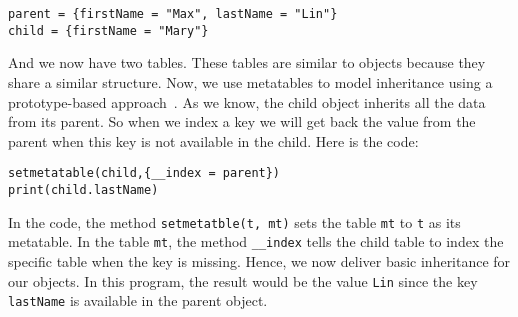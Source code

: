 \begin{verbatim}
parent = {firstName = "Max", lastName = "Lin"} 
child = {firstName = "Mary"} 
\end{verbatim}

And we now have two tables. These tables are similar to objects because they share a similar structure. Now, we use metatables to model inheritance using a prototype-based approach~\cite{PIJS}. As we know, the child object inherits all the data from its parent. So when we index a key we will get back the value from the parent when this key is not available in the child. Here is the code:

\begin{verbatim}
setmetatable(child,{__index = parent}) 
print(child.lastName)
\end{verbatim}

In the code, the method {\tt setmetatble(t, mt)} sets the table {\tt mt} to {\tt t} as its metatable. In the table {\tt mt}, the method {\tt \_\_index} tells the child table to index the specific table when the key is missing. Hence, we now deliver basic inheritance for our objects. In this program, the result would be the value {\tt Lin} since the key {\tt lastName} is available in the parent object.
